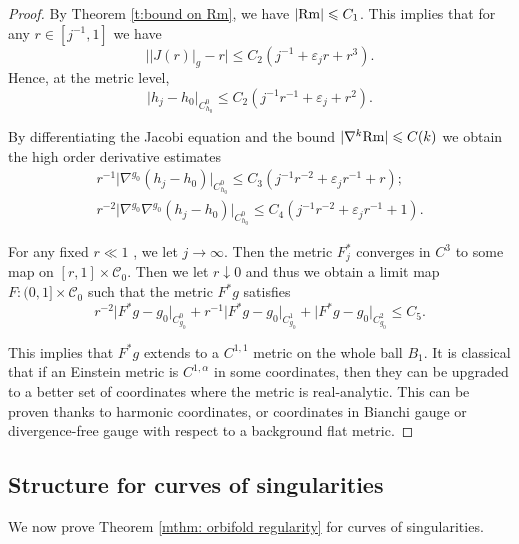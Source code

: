 \documentclass[11pt,reqno]{amsart}
\numberwithin{equation}{section}
\newcommand{\Rm}{{\rm Rm}}
\newcommand{\cC}{\mathcal{C}}
\theoremstyle{definition}
\theoremstyle{remark}
\begin{document}
\begin{proof}
By Theorem \ref{t:bound on Rm}, we have $|\Rm| \leqslant C_1$. This implies that for any $r \in [j^{-1},1]$ we have
\begin{equation*}
    \Big| |J(r)|_g - r \Big| \leqslant C_2 (j^{-1} + \varepsilon_j r + r^3).
\end{equation*}
Hence, at the metric level,
\begin{equation*}
    \Big| h_j - h_0 \Big|_{C^0_{h_0}} \leqslant C_2 (j^{-1} r^{-1} + \varepsilon_j  + r^2).
\end{equation*}

By differentiating the Jacobi equation and the bound $|\nabla^k \Rm| \leqslant C(k)$ we obtain the high order derivative estimates
\begin{equation*}
\begin{split}
    r^{-1} \Big|\nabla^{g_0}( h_j - h_0) \Big|_{C^0_{h_0}} \leqslant C_3 (j^{-1} r^{-2} + \varepsilon_j r^{-1}  + r); \\
    r^{-2}\Big|\nabla^{g_0} \nabla^{g_0} ( h_j - h_0) \Big|_{C^0_{h_0}} \leqslant C_4 (j^{-1} r^{-2} + \varepsilon_j r^{-1} + 1). 
\end{split}
\end{equation*}

For any fixed $r \ll 1$ , we let $j\to \infty$. Then the metric $F^*_j$ converges in $C^3$ to some map on $[r ,1] \times \cC_0$. Then we let $r \downarrow 0$ and thus we obtain a limit map $F : (0,1] \times \cC_0$ such that the metric $F^*g$ satisfies
\begin{equation*}
    r^{-2} \Big| F^*g - g_0\Big|_{C^0_{g_0}} + r^{-1} \Big| F^*g - g_0\Big|_{C^1_{g_0}} + \Big| F^* g - g_0\Big|_{C^2_{g_0}} \leqslant C_5.
\end{equation*}

This implies that $F^*g$ extends to a $C^{1,1}$ metric on the whole ball $B_1$. It is classical that if an Einstein metric is $C^{1,\alpha}$ in some coordinates, then they can be upgraded to a better set of coordinates where the metric is real-analytic. This can be proven thanks to harmonic coordinates, or coordinates in Bianchi gauge or divergence-free gauge with respect to a background flat metric.
\end{proof}


\subsection{Structure for curves of singularities}

We now prove Theorem  \ref{mthm: orbifold regularity} for curves of singularities.
\end{document}
